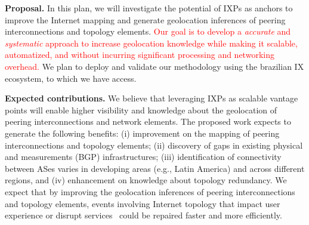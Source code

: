 	\textbf{Proposal.} In this plan, we will investigate the potential of IXPs as anchors to improve the Internet mapping and generate geolocation inferences of peering interconnections and topology elements. \textcolor{red}{Our goal is to develop a \emph{accurate} and \emph{systematic} approach to increase geolocation knowledge while making it scalable, automatized, and without incurring significant processing and networking overhead.} We plan to deploy and validate our methodology using the brazilian IX ecosystem, to which we have access.



	\textbf{Expected contributions.} We believe that leveraging IXPs as scalable vantage points will enable higher visibility and knowledge about the geolocation of peering interconnections and network elements. The proposed work expects to generate the following benefits: (i) improvement on the mapping of peering interconnections and topology elements; (ii) discovery of gaps in existing physical and measurements (BGP) infrastructures; (iii) identification of connectivity between ASes varies in developing areas (e.g., Latin America) and across different regions, and (iv) enhancement on knowledge about topology redundancy. We expect that by improving the geolocation inferences of peering interconnections and topology elements, events involving Internet topology that impact user experience or disrupt services~\cite{routerDMV, routerUnited, facebookCDN} could be repaired faster and more efficiently.

